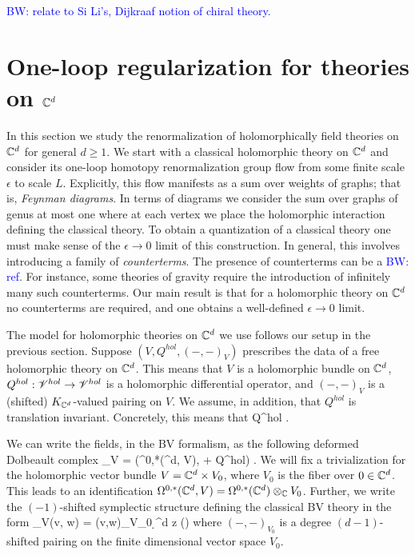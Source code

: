 \documentclass[10pt]{article}
\def\brian{\textcolor{blue}{BW: }\textcolor{blue}}
\begin{document}
\begin{rmk}
\brian{relate to Si Li's, Dijkraaf notion of chiral theory.}
\end{rmk}


\section{One-loop regularization for theories on $\mathbb C^d$} \label{sec: hol renorm}

In this section we study the renormalization of holomorphically field theories on $\mathbb C^d$ for general $d \geq 1$. 
We start with a classical holomorphic theory on $\mathbb C^d$ and consider its one-loop homotopy renormalization group flow from some finite scale $\epsilon$ to scale $L$.
Explicitly, this flow manifests as a sum over weights of graphs; that is, {\em Feynman diagrams}.
In terms of diagrams we consider the sum over graphs of genus at most one where at each vertex we place the holomorphic interaction defining the classical theory.
To obtain a quantization of a classical theory one must make sense of the $\epsilon \to 0$ limit of this construction. 
In general, this involves introducing a family of {\em counterterms}.
The presence of counterterms can be a \brian{ref}. 
For instance, some theories of gravity require the introduction of infinitely many such counterterms.
Our main result is that for a holomorphic theory on $\mathbb C^d$ no counterterms are required, and one obtains a well-defined $\epsilon \to 0$ limit. 

The model for holomorphic theories on $\mathbb C^d$ we use follows our setup in the previous section.
Suppose $(V, Q^{hol}, (-,-)_V)$ prescribes the data of a free holomorphic theory on $\mathbb C^d$.
This means that $V$ is a holomorphic bundle on $\mathbb C^d$, $Q^{hol} : \mathscr V^{hol} \to \mathscr V^{hol}$ is a holomorphic differential operator, and $(-,-)_V$ is a (shifted) $K_{\mathbb C^d}$-valued pairing on $V$. 
We assume, in addition, that $Q^{hol}$ is translation invariant.
Concretely, this means that
\ben
Q^{hol} \in \CC {}.
\een

We can write the fields, in the BV formalism, as the following deformed Dolbeault complex
\ben
\sE_V = \left(\Omega^{0,*}(\CC^d, V), \dbar + Q^{hol}\right) .
\een
We will fix a trivialization for the holomorphic vector bundle $V = \mathbb C^d \times V_0$, where $V_0$ is the fiber over $0 \in \mathbb C^d$.
This leads to an identification $\Omega^{0,*}(\mathbb C^d , V) = \Omega^{0,*}(\mathbb C^d) \otimes_\mathbb C V_0$.
Further, we write the $(-1)$-shifted symplectic structure defining the classical BV theory in the form
\ben
\omega_V(\alpha \tensor v, \beta \tensor w) = (v,w)_{V_0} \int \d^d z (\alpha \wedge \beta)
\een
where $(-,-)_{V_0}$ is a degree $(d-1)$-shifted pairing on the finite dimensional vector space $V_0$. 
\end{document}
